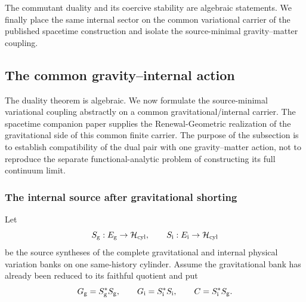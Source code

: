 \documentclass[11pt]{article}
\theoremstyle{definition}
\theoremstyle{remark}
\newcommand{\Hh}{\mathcal H}
\begin{document}

\medskip
The commutant duality and its coercive stability are algebraic statements.  We
finally place the same internal sector on the common variational carrier of the
published spacetime construction and isolate the source-minimal gravity--matter
coupling.

\subsection{The common gravity--internal action}
\label{sec:coupled-action}

The duality theorem is algebraic.  We now formulate the source-minimal
variational coupling abstractly on a common gravitational/internal carrier.
The spacetime companion paper \cite{PelissierSpacetime2026} supplies the
Renewal-Geometric realization of the gravitational side of this common finite
carrier.  The purpose of the subsection is to establish compatibility of the
dual pair with one gravity--matter action, not to reproduce the separate
functional-analytic problem of constructing its full continuum limit.

\subsubsection{The internal source after gravitational shorting}

Let
\[
S_{\rm g}:E_{\rm g}\to\Hh_{\rm cyl},
\qquad
S_{\rm i}:E_{\rm i}\to\Hh_{\rm cyl}
\]
be the source syntheses of the complete gravitational and internal physical
variation banks on one same-history cylinder.  Assume the gravitational bank
has already been reduced to its faithful quotient and put
\[
G_{\rm g}=S_{\rm g}^*S_{\rm g},
\qquad
G_{\rm i}=S_{\rm i}^*S_{\rm i},
\qquad
C=S_{\rm i}^*S_{\rm g}.
\]
\end{document}
